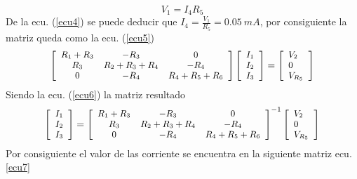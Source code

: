 \documentclass[twocolumn]{IEEEtran}
\begin{document}
\begin{equation}
 {V_1} = {I_4}{R_5}
\label{ecu4}
\end{equation}
\noindent
De la ecu. (\ref{ecu4}) se puede deducir que $I_4 = \frac{V_1}{R_5} = 0.05 \ mA$, por consiguiente la matriz queda como la ecu. (\ref{ecu5})
\begin{equation}
\footnotesize
\left[ {\begin{array}{*{20}{c}}
   {{R_1} + {R_3}} & { - {R_3}} & 0  \\
   {{R_3}} & {{R_2} + {R_3} + {R_4}} & { - {R_4}}  \\
   0 & { - {R_4}} & {{R_4} + {R_5} + {R_6}}  \\
\end{array}} \right]\left[ \begin{array}{l}
 {I_1} \\ 
 {I_2} \\ 
 {I_3} \\ 
 \end{array} \right] = \left[ \begin{array}{l}
 {V_2} \\ 
 0 \\ 
 V_{R_5} \\ 
 \end{array} \right]
\label{ecu5}
\end{equation}
\noindent
Siendo la ecu. (\ref{ecu6}) la matriz resultado
\begin{equation}
\footnotesize
 \left[ \begin{array}{l}
 {I_1} \\ 
 {I_2} \\ 
 {I_3} \\ 
 \end{array} \right] = {\left[ {\begin{array}{*{20}{c}}
   {{R_1} + {R_3}} & { - {R_3}} & 0  \\
   {{R_3}} & {{R_2} + {R_3} + {R_4}} & { - {R_4}}  \\
   0 & { - {R_4}} & {{R_4} + {R_5} + {R_6}}  \\
\end{array}} \right]^{ - 1}}\left[ \begin{array}{l}
 {V_2} \\ 
 0 \\ 
 V_{R_5} \\ 
 \end{array} \right]
\label{ecu6}
\end{equation}
\noindent
Por consiguiente el valor de las corriente se encuentra en la siguiente matriz ecu. \ref{ecu7}
\end{document}
